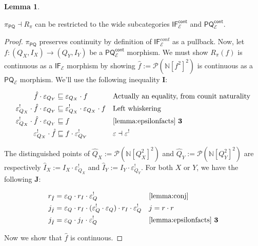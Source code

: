 \documentclass{article}
\makeatletter
\newcommand{\allproofs}{} %
\newif\ifproofsinappendix
\newcommand{\lemmawithproof}[3]{%
  \begin{lemma}\label{#1}
    #2  
    \ifproofsinappendix \hyperref[xxx#1]{(Proof)} \fi
  \end{lemma}
    \ifproofsinappendix
  \g@addto@macro\allproofs{%
    \par\medskip
    \noindent
    \subsection*{\cref{#1}}\par
    #2\par
    \begin{proof}\label{xxx#1}
      #3
    \end{proof}%
  }
      \else

    \begin{proof}
      #3
    \end{proof}
    \fi 
}
\theoremstyle{definition}
\newtheorem{lemma}{Lemma}[section]
\newcommand{\N}{\mathbb{N}}
\newcommand{\cE}{\mathcal{E}}
\newcommand{\cP}{\mathcal{P}}
\newcommand{\cat}[1]{\mathsf{#1}}
\makeatother
\begin{document}
\lemmawithproof{lemma:adjrest}{
$\pi_{\cat{PQ}} \dashv R_\pi$ can be restricted to the wide subcategories $\cat{IF_\cE^{cont}}$ and $\cat{PQ_\cE^{cont}}$.
}{

$\pi_{\cat{PQ}}$ preserves continuity by definition of $\cat{IF}^{cont}_\cE$ as a pullback. Now, let $f\colon (Q_X,I_X)\to (Q_Y,I_Y)$ be a $\cat{PQ_\cE^{cont}}$ morphism. 
We must show $R_\pi(f)$ is continuous as a $\cat{IF_\cE}$ morphism by showing $\hat f:=\cP(\N[f^2]^2)$ is continuous as a $\cat{PQ_\cE}$ morphism. 
We'll use the following inequality {\bf I}:

\begin{align*}
    \hat f \cdot \varepsilon_{Q_Y} &\sqsubseteq \varepsilon_{Q_X} \cdot f &&\text{Actually an equality, from counit naturality}\\
        \varepsilon_{Q_X}^!\cdot\hat f \cdot \varepsilon_{Q_Y} &\sqsubseteq  \varepsilon_{Q_X}^!\cdot \varepsilon_{Q_X} \cdot f &&\text{Left whiskering}\\
        \varepsilon_{Q_X}^!\cdot\hat f \cdot \varepsilon_{Q_Y} &\sqsubseteq   f &&\text{\cref{lemma:epsilonfacts} {\bf 3}}\\
    \varepsilon_{Q_X}^!\cdot\hat f &\sqsubseteq   f\cdot \varepsilon_{Q_Y}^!  &&\varepsilon\dashv \varepsilon^! \\
\end{align*}


The distinguished points of $\hat Q_X := \cP(\N[Q_X^2]^2)$ and $\hat Q_Y := \cP(\N[Q_Y^2]^2)$ are respectively $\hat I_X := I_X\cdot \varepsilon^!_{Q_X}$ and $\hat I_Y := I_Y\cdot \varepsilon^!_{Q_Y}$. For both $X$ or $Y$, we have the following {\bf J}: 

\begin{align*}
    r_{\hat I} &= \varepsilon_Q \cdot r_I \cdot \varepsilon^!_Q  &&\text{\cref{lemma:conj}}\\
    j_{\hat I} &= \varepsilon_Q \cdot r_I \cdot (\varepsilon^!_Q \cdot \varepsilon_Q) \cdot r_I \cdot \varepsilon^!_Q && j=r\cdot r\\ 
    j_{\hat I} &=\varepsilon_Q \cdot j_I \cdot \varepsilon_Q^! &&\text{\cref{lemma:epsilonfacts} {\bf 3}}\\
\end{align*}

Now we show that $\hat f$ is continuous.

}
\end{document}
